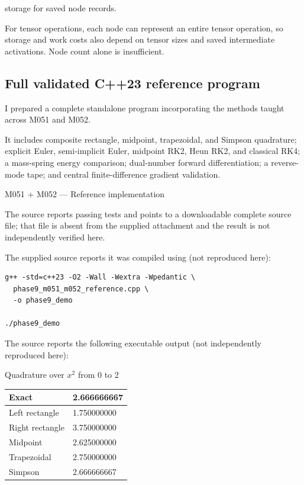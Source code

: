 storage for saved node records.

For tensor operations, each node can represent an entire tensor operation, so storage and work costs also depend on tensor sizes and saved intermediate activations. Node count alone is insufficient.

\subsection{Full validated C++23 reference program}\label{02-foundations-ii-ch022-full-validated-c23-reference-program}

\hypertarget{02-foundations-ii-ch022-full-validated-c23-reference-program}{}

I prepared a complete standalone program incorporating the methods taught across M051 and M052.

It includes composite rectangle, midpoint, trapezoidal, and Simpson quadrature; explicit Euler, semi-implicit Euler, midpoint RK2, Heun RK2, and classical RK4; a mass-spring energy comparison; dual-number forward differentiation; a reverse-mode tape; and central finite-difference gradient validation.

M051 + M052 --- Reference implementation

The source reports passing tests and points to a downloadable complete source file; that file is absent from the supplied attachment and the result is not independently verified here.

The supplied source reports it was compiled using (not reproduced here):

\begin{verbatim}
g++ -std=c++23 -O2 -Wall -Wextra -Wpedantic \
  phase9_m051_m052_reference.cpp \
  -o phase9_demo

./phase9_demo
\end{verbatim}

The source reports the following executable output (not independently reproduced here):

Quadrature over \(x^2\) from 0 to 2

{\def\LTcaptype{none} %
\begin{longtable}[]{@{}ll@{}}
\toprule\noalign{}
Exact & 2.666666667 \\
\midrule\noalign{}
\endhead
\bottomrule\noalign{}
\endlastfoot
Left rectangle & 1.750000000 \\
Right rectangle & 3.750000000 \\
Midpoint & 2.625000000 \\
Trapezoidal & 2.750000000 \\
Simpson & 2.666666667 \\
\end{longtable}
}

